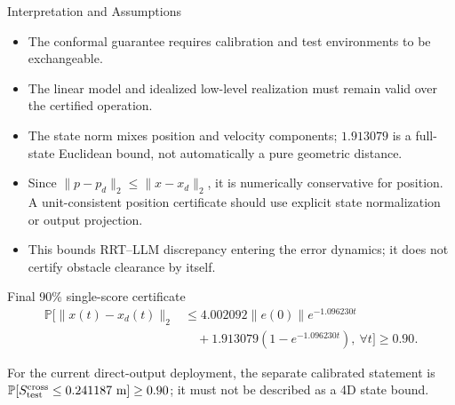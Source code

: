 \documentclass[aspectratio=43,11pt]{beamer}
\newcommand{\xd}{x_d}
\begin{document}
\begin{frame}{Interpretation and Assumptions}
\footnotesize
\begin{itemize}
  \item The conformal guarantee requires calibration and test environments to be exchangeable.
  \item The linear model and idealized low-level realization must remain valid over the certified operation.
  \item The state norm mixes position and velocity components; $1.913079$ is a full-state Euclidean bound, not automatically a pure geometric distance.
  \item Since $\|p-p_d\|_2\leq\|x-x_d\|_2$, it is numerically conservative for position. A unit-consistent position certificate should use explicit state normalization or output projection.
  \item This bounds RRT--LLM discrepancy entering the error dynamics; it does not certify obstacle clearance by itself.
\end{itemize}

\begin{block}{Final 90\% single-score certificate}
\[
\begin{aligned}
\mathbb P\!\big[\|x(t)-\xd(t)\|_2
&\leq4.002092\|e(0)\|e^{-1.096230t}\\
&\quad+1.913079(1-e^{-1.096230t}),\ \forall t\big]\geq0.90.
\end{aligned}
\]
\end{block}

\vspace{0.3em}
For the current direct-output deployment, the separate calibrated statement is
$\mathbb P[S_{\rm test}^{\rm cross}\leq0.241187\ {\rm m}]\geq0.90$;
it must not be described as a 4D state bound.
\end{frame}
\end{document}
